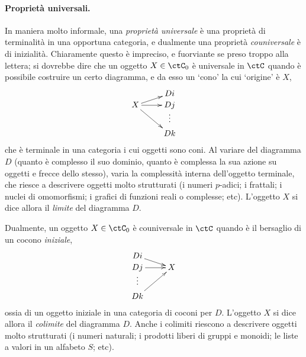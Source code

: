 \paragraph*{Proprietà universali.}
In maniera molto informale, una \emph{proprietà universale} è una proprietà di terminalità in una opportuna categoria, e dualmente una proprietà \emph{couniversale} è di inizialità. Chiaramente questo è impreciso, e fuorviante se preso troppo alla lettera; si dovrebbe dire che un oggetto \(X\in\ctC_0\) è universale in \(\ctC\) quando è possibile costruire un certo diagramma, e da esso un `cono' la cui `origine' è \(X\),
\[\xymatrix@R=0mm{
	& Di \\
	X \ar@{->}[ru] \ar@{->}[r] \ar@{->}[rdd] & Dj \\
	& \vdots \\
	& Dk
	}\]
che è terminale in una categoria i cui oggetti sono coni. Al variare del diagramma \(D\) (quanto è complesso il suo dominio, quanto è complessa la sua azione su oggetti e frecce dello stesso), varia la complessità interna dell'oggetto terminale, che riesce a descrivere oggetti molto strutturati (i numeri \(p\)-adici; i frattali; i nuclei di omomorfismi; i grafici di funzioni reali o complesse; etc). L'oggetto \(X\) si dice allora il \emph{limite} del diagramma \(D\).

Dualmente, un oggetto \(X\in\ctC_0\) è couniversale in \(\ctC\) quando è il bersaglio di un cocono \emph{iniziale},
\[\xymatrix@R=0mm{
	Di \ar@{->}[rd] &  \\
	Dj \ar@{->}[r] & X \\
	\vdots &  \\
	Dk \ar@{->}[ruu] &
	}\]
ossia di un oggetto iniziale in una categoria di coconi per \(D\). L'oggetto \(X\) si dice allora il \emph{colimite} del diagramma \(D\). Anche i colimiti riescono a descrivere oggetti molto strutturati (i numeri naturali; i prodotti liberi di gruppi e monoidi; le liste a valori in un alfabeto \(S\); etc).

